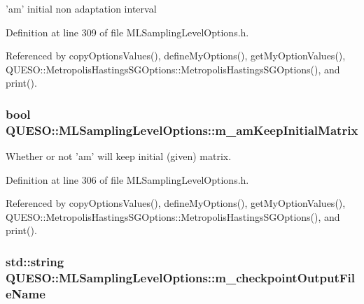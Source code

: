'am' initial non adaptation interval 



Definition at line 309 of file M\-L\-Sampling\-Level\-Options.\-h.



Referenced by copy\-Options\-Values(), define\-My\-Options(), get\-My\-Option\-Values(), Q\-U\-E\-S\-O\-::\-Metropolis\-Hastings\-S\-G\-Options\-::\-Metropolis\-Hastings\-S\-G\-Options(), and print().

\hypertarget{class_q_u_e_s_o_1_1_m_l_sampling_level_options_a9adec09f474c263078450c6ad66518e5}{
\subsubsection[{m\-\_\-am\-Keep\-Initial\-Matrix}]{\setlength{\rightskip}{0pt plus 5cm}bool Q\-U\-E\-S\-O\-::\-M\-L\-Sampling\-Level\-Options\-::m\-\_\-am\-Keep\-Initial\-Matrix}}\label{class_q_u_e_s_o_1_1_m_l_sampling_level_options_a9adec09f474c263078450c6ad66518e5}


Whether or not 'am' will keep initial (given) matrix. 



Definition at line 306 of file M\-L\-Sampling\-Level\-Options.\-h.



Referenced by copy\-Options\-Values(), define\-My\-Options(), get\-My\-Option\-Values(), Q\-U\-E\-S\-O\-::\-Metropolis\-Hastings\-S\-G\-Options\-::\-Metropolis\-Hastings\-S\-G\-Options(), and print().

\hypertarget{class_q_u_e_s_o_1_1_m_l_sampling_level_options_aa53156a239401da4600af25921bac260}{
\subsubsection[{m\-\_\-checkpoint\-Output\-File\-Name}]{\setlength{\rightskip}{0pt plus 5cm}std\-::string Q\-U\-E\-S\-O\-::\-M\-L\-Sampling\-Level\-Options\-::m\-\_\-checkpoint\-Output\-File\-Name}}\label{class_q_u_e_s_o_1_1_m_l_sampling_level_options_aa53156a239401da4600af25921bac260}


